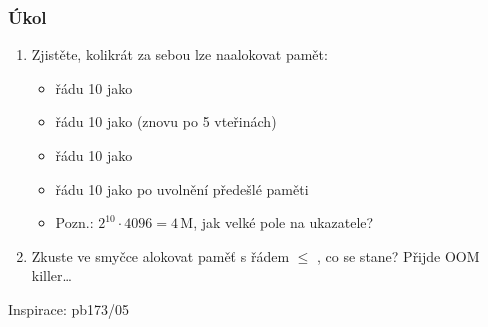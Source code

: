 \begin{frame}
  \frametitle{Úkol}


  \begin{enumerate}
  \item Zjistěte, kolikrát za sebou lze naalokovat pamět:
  \begin{itemize}
  \item řádu 10 jako 
  \item řádu 10 jako  (znovu po 5 vteřinách)
  \item řádu 10 jako 
  \item řádu 10 jako  po uvolnění předešlé paměti
  \item Pozn.: $2^{10} \cdot 4096 = 4\,\text{M}$, jak velké pole na ukazatele?
  \end{itemize}

  \item Zkuste ve smyčce alokovat paměť s řádem $\leq$
    , co se stane?
    \pause
    Přijde OOM killer\dots
  \end{enumerate}

  \bigskip

  Inspirace: pb173/05

\end{frame}
